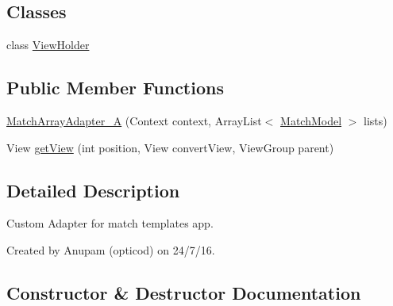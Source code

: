 \subsection*{Classes}
\begin{DoxyCompactItemize}
\item 
class \hyperlink{classorg_1_1buildmlearn_1_1matchtemplate_1_1adapter_1_1MatchArrayAdapter__A_1_1ViewHolder}{View\+Holder}
\end{DoxyCompactItemize}
\subsection*{Public Member Functions}
\begin{DoxyCompactItemize}
\item 
\hyperlink{classorg_1_1buildmlearn_1_1matchtemplate_1_1adapter_1_1MatchArrayAdapter__A_aef3908ca93f7622c2d2e0a4283e12342}{Match\+Array\+Adapter\+\_\+A} (Context context, Array\+List$<$ \hyperlink{classorg_1_1buildmlearn_1_1matchtemplate_1_1data_1_1MatchModel}{Match\+Model} $>$ lists)
\item 
View \hyperlink{classorg_1_1buildmlearn_1_1matchtemplate_1_1adapter_1_1MatchArrayAdapter__A_a5f109d6960fefc2234d8269b0234cc3a}{get\+View} (int position, View convert\+View, View\+Group parent)
\end{DoxyCompactItemize}


\subsection{Detailed Description}
Custom Adapter for match template\textquotesingle{}s app. 

Created by Anupam (opticod) on 24/7/16. 

\subsection{Constructor \& Destructor Documentation}
